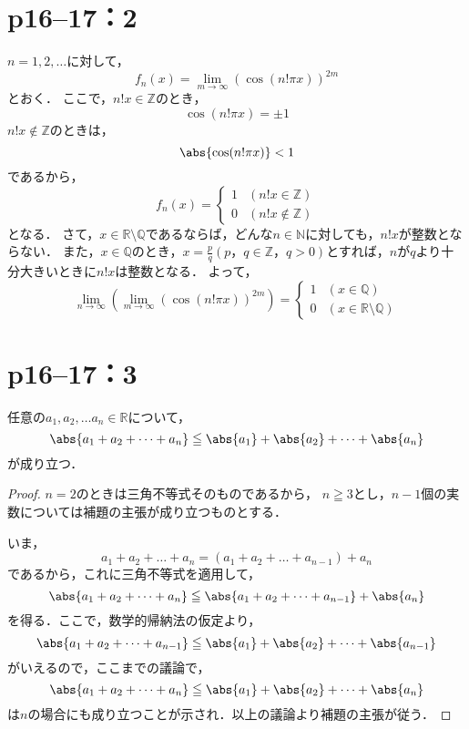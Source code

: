 \documentclass[a4paper,10pt,fleqn]{ltjsarticle}
\begin{document}
\section*{p16--17：2}

$n=1,2,\ldots$に対して，
\[
    f_{n} (x)=\lim_{m \to \infty} (\cos (n! \pi x)) ^{2m}
\]
とおく．
ここで，$n!x \in \mathbb{Z}$のとき，
\[
    \cos (n! \pi x)=\pm 1
\]
$n!x \notin \mathbb{Z}$のときは，
\[
    \abs{\cos (n! \pi x)}<1
\]
であるから，
\[
    f_{n} (x)=
    \begin{cases}
        1 & (n!x \in \mathbb{Z})    \\
        0 & (n!x \notin \mathbb{Z})
    \end{cases}
\]
となる．
さて，$x \in \mathbb{R} \setminus \mathbb{Q}$であるならば，どんな$n \in \mathbb{N}$に対しても，$n! x$が整数とならない．
また，$x \in \mathbb{Q}$のとき，$ x=\frac{p}{q}(p，q \in \mathbb{Z}，q>0)$とすれば，$n$が$q$より十分大きいときに$n!x$は整数となる．
よって，
\[
    \lim_{n \to \infty} \left( \lim_{m \to \infty} (\cos (n! \pi x)) ^{2m} \right)=
    \begin{cases}
        1 & (x \in \mathbb{Q})                      \\
        0 & (x \in \mathbb{R} \setminus \mathbb{Q})
    \end{cases}
\]


\section*{p16--17：3}


任意の$a_1 , a_2 , \dots a_n \in \mathbb{R}$について，
\[
    \abs{a_1+a_2+\dots+a_n} \leqq \abs{a_1}+\abs{a_2}+\dots+\abs{a_n}
\]
が成り立つ．


\begin{proof}
    $n=2$のときは三角不等式そのものであるから，
    $n \geqq 3$とし，$n-1$個の実数については補題の主張が成り立つものとする．

    いま，
    \[
        a_1 + a_2 + \dots + a_n = (a_1+a_2+\dots+a_{n-1})+a_n
    \]
    であるから，これに三角不等式を適用して，
    \[
        \abs{a_1+a_2+\dots+a_n} \leqq \abs{a_1+a_2+\dots+a_{n-1}} +\abs{a_n}
    \]
    を得る．ここで，数学的帰納法の仮定より，
    \[
        \abs{a_1+a_2+\dots+a_{n-1}} \leqq \abs{a_1}+\abs{a_2}+\dots+\abs{a_{n-1}}
    \]
    がいえるので，ここまでの議論で，
    \[
        \abs{a_1+a_2+\dots+a_n} \leqq \abs{a_1}+\abs{a_2}+\dots+\abs{a_n}
    \]
    は$n$の場合にも成り立つことが示され．以上の議論より補題の主張が従う．
\end{proof}
\end{document}
